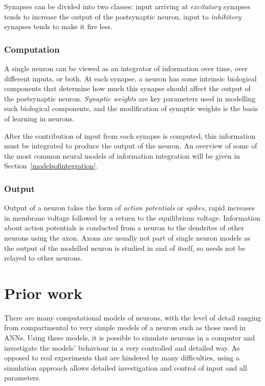 \documentclass[a4paper,12pt]{report}
\theoremstyle{definition}
\begin{document}
Synapses can be divided into two classes: input arriving at \emph{excitatory} synapses tends to increase the output of the postsynaptic neuron, input to \emph{inhibitory} synapses tends to make it fire less.

\subsubsection{Computation}
A single neuron can be viewed as an integrator of information over time, over different inputs, or both. At each synapse, a neuron has some intrinsic biological components that determine how much this synapse should affect the output of the postsynaptic neuron. \emph{Synaptic weights} are key parameters used in modelling such biological components, and the modification of synaptic weights is the basis of learning in neurons.

After the contribution of input from each synapse is computed, this information must be integrated to produce the output of the neuron. An overview of some of the most common neural models of information integration will be given in Section~\ref{modelsofintegration}.

\subsubsection{Output}

Output of a neuron takes the form of \emph{action potentials} or \emph{spikes}, rapid increases in membrane voltage followed by a return to the equilibrium voltage. Information about action potentials is conducted from a neuron to the dendrites of other neurons using the axon. Axons are usually not part of single neuron models as the output of the modelled neuron is studied in and of itself, so needs not be relayed to other neurons.

\section{Prior work}


There are many computational models of neurons, with the level of detail ranging from compartmental to very simple models of a neuron such as those used in ANNs. Using these models, it is possible to simulate neurons in a computer and investigate the models' behaviour in a very controlled and detailed way. As opposed to real experiments that are hindered by many difficulties, using a simulation approach allows detailed investigation and control of input and all parameters.
\end{document}
